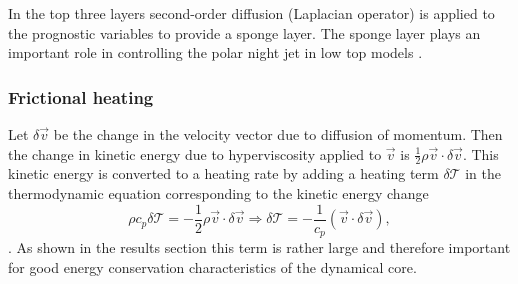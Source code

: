 \documentclass{agujournal}
\begin{document}
{In the top three layers second-order diffusion (Laplacian operator) is applied to the prognostic variables to provide a sponge layer. The sponge layer plays an important role in controlling the polar night jet in low top models \citep[see, e.g., ][]{L2011IJHPC}.

%
\subsubsection{Frictional heating}\label{sec:frictional_heating}
Let $\delta \vec{v}$ be the change in the velocity vector due to diffusion of momentum. Then the change in kinetic energy due to hyperviscosity applied to $\vec{v}$ is $\frac{1}{2}\rho \vec{v} \cdot \delta \vec{v}$. This kinetic energy is converted to a heating rate by adding a heating term $\delta \mathcal{T}$ in the thermodynamic equation corresponding to the kinetic energy change
\begin{equation}
\rho c_p \delta \mathcal{T}=-\frac{1}{2}\rho \vec{v} \cdot \delta \vec{v} \Rightarrow
 \delta \mathcal{T}=-\frac{1}{c_p}\left(\vec{v}\cdot \delta \vec{v}\right),\label{eq:tcp}
\end{equation}
\citep[p.71 in ][]{CAM5}. As shown in the results section this term is rather large and therefore important for good energy conservation characteristics of the dynamical core.
}
\end{document}
